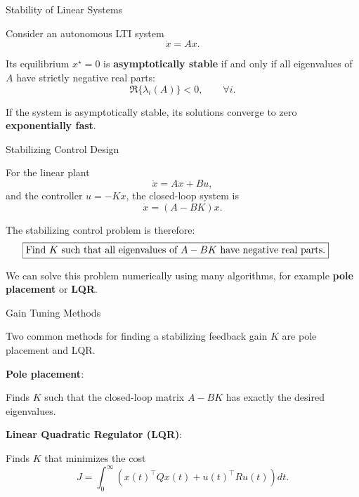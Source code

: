 \documentclass{beamer}
\begin{document}
\begin{frame}{Stability of Linear Systems}
	\begin{flushleft}
		
		Consider an autonomous LTI system
		\[
		\dot{x}=Ax.
		\]
		
		Its equilibrium \(x^\star=0\) is \textbf{asymptotically stable} if and only if
		all eigenvalues of \(A\) have strictly negative real parts:
		\[
		\Re\{\lambda_i(A)\}<0,
		\qquad \forall i.
		\]
		
		If the system is asymptotically stable, its solutions converge to zero
		\textbf{exponentially fast}.
		
	\end{flushleft}
\end{frame}

\begin{frame}{Stabilizing Control Design}
	\begin{flushleft}
		For the linear plant
		\[
		\dot{x}=Ax+Bu,
		\]
		and the controller \(u=-Kx\), the closed-loop system is
		\[
		\dot{x}=(A-BK)x.
		\]
		
		The stabilizing control problem is therefore:
		\[
		\hspace{-0.5cm} \boxed{\text{Find }K\text{ such that all eigenvalues of }A-BK
			\text{ have negative real parts.}}
		\]
		
		We can solve this problem numerically using many algorithms, for example
		\textbf{pole placement} or \textbf{LQR}.
		
	\end{flushleft}
\end{frame}

\begin{frame}{Gain Tuning Methods}
	\begin{flushleft}
		
		Two common methods for finding a stabilizing feedback gain \(K\) are
		pole placement and LQR.
		
		\bigskip
		
		\textbf{Pole placement}:
		
		Finds \(K\) such that the closed-loop matrix \(A-BK\) has exactly the
		desired eigenvalues.
		
		\bigskip
		
		\textbf{Linear Quadratic Regulator (LQR)}:
		
		Finds \(K\) that minimizes the cost
		\[
		J=\int_0^\infty \left(x(t)^\top Qx(t)+u(t)^\top Ru(t)\right)dt.
		\]
		
	\end{flushleft}
\end{frame}
\end{document}
